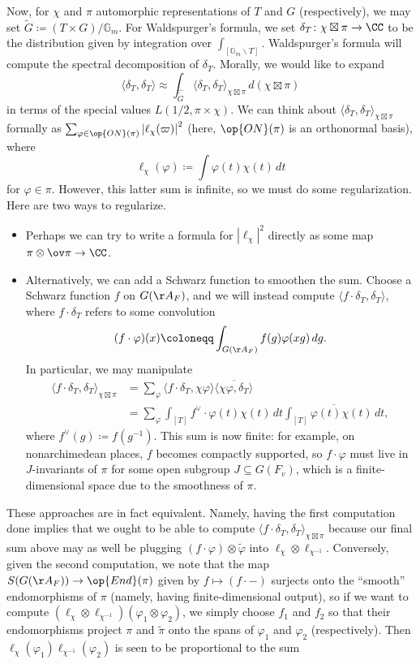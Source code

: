 \documentclass[../notes.tex]{subfiles}
\begin{document}
Now, for $\chi$ and $\pi$ automorphic representations of $T$ and $G$ (respectively), we may set $\widetilde G\coloneqq(T\times G)/\mathbb G_m$. For Waldspurger's formula, we set $\delta_T\colon\chi\boxtimes\pi\to\CC$ to be the distribution given by integration over $\int_{[\mathbb G_m\backslash T]}$. Waldspurger's formula will compute the spectral decomposition of $\delta_T$. Morally, we would like to expand
\[\langle\delta_T,\delta_T\rangle\approx\int_{\widehat{\widetilde G}}\langle\delta_T,\delta_T\rangle_{\chi\boxtimes\pi}\,d(\chi\boxtimes\pi)\]
in terms of the special values $L(1/2,\pi\times\chi)$. We can think about $\langle\delta_T,\delta_T\rangle_{\chi\boxtimes\pi}$ formally as $\sum_{\varphi\in\op{ON}(\pi)}\left|\ell_\chi(\varpi)\right|^2$ (here, $\op{ON}(\pi)$ is an orthonormal basis), where
\[\ell_\chi(\varphi)\coloneqq\int\varphi(t)\chi(t)\,dt\]
for $\varphi\in\pi$. However, this latter sum is infinite, so we must do some regularization. Here are two ways to regularize.
\begin{itemize}
	\item Perhaps we can try to write a formula for $\left|\ell_\chi\right|^2$ directly as some map $\pi\otimes\ov\pi\to\CC$.
	\item Alternatively, we can add a Schwarz function to smoothen the sum. Choose a Schwarz function $f$ on $G(\AA_F)$, and we will instead compute $\langle f\cdot\delta_T,\delta_T\rangle$, where $f\cdot\delta_T$ refers to some convolution
	\[(f\cdot\varphi)(x)\coloneqq\int_{G(\AA_F)}f(g)\varphi(xg)\,dg.\]
	In particular, we may manipulate
	\begin{align*}
		\langle f\cdot\delta_T,\delta_T\rangle_{\chi\boxtimes\pi} &= \sum_\varphi\langle f\cdot\delta_T,\chi\varphi\rangle\overline{\langle\chi\varphi,\delta_T\rangle} \\
		&= \sum_\varphi\int_{[T]}f^\lor\cdot\varphi(t)\chi(t)\,dt\overline{\int_{[T]}\varphi(t)\chi(t)\,dt},
	\end{align*}
	where $f^\lor(g)\coloneqq f\left(g^{-1}\right)$.
	This sum is now finite: for example, on nonarchimedean places, $f$ becomes compactly supported, so $f\cdot\varphi$ must live in $J$-invariants of $\pi$ for some open subgroup $J\subseteq G(F_v)$, which is a finite-dimensional space due to the smoothness of $\pi$.
\end{itemize}
These approaches are in fact equivalent. Namely, having the first computation done implies that we ought to be able to compute $\langle f\cdot\delta_T,\delta_T\rangle_{\chi\boxtimes\pi}$ because our final sum above may as well be plugging $(f\cdot\varphi)\otimes\widetilde\varphi$ into $\ell_\chi\otimes\ell_{\chi^{-1}}$. Conversely, given the second computation, we note that the map $S(G(\AA_F))\to\op{End}(\pi)$ given by $f\mapsto(f\cdot-)$ surjects onto the ``smooth'' endomorphisms of $\pi$ (namely, having finite-dimensional output), so if we want to compute $(\ell_\chi\otimes\ell_{\chi^{-1}})(\varphi_1\otimes\varphi_2)$, we simply choose $f_1$ and $f_2$ so that their endomorphisms project $\pi$ and $\widetilde\pi$ onto the spans of $\varphi_1$ and $\varphi_2$ (respectively). Then $\ell_\chi(\varphi_1)\ell_{\chi^{-1}}(\varphi_2)$ is seen to be proportional to the sum
\end{document}

